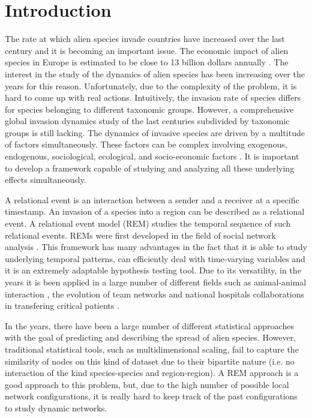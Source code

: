 \documentclass[mscthesis]{usiinfthesis}
\begin{document}
\chapter{Introduction}

The rate at which alien species invade countries have increased over the last century and it is becoming an important issue. The economic impact of alien species in Europe is estimated to be close to 13 billion dollars annually \cite{intro:rate}. The interest in the study of the dynamics of alien species has been increasing over the years for this reason. Unfortunately, due to the complexity of the problem, it is hard to come up with real actions. Intuitively, the invasion rate of species differs for species belonging to different taxonomic groups. However, a comprehensive global invasion dynamics study of the last centuries subdivided by taxonomic groups is still lacking. The dynamics of invasive species are driven by a multitude of factors simultaneously. These factors can be complex involving exogenous, endogenous, sociological, ecological, and socio-economic factors \cite{intro:factors}. It is important to develop a framework capable of studying and analyzing all these underlying effects simultaneously. 

A relational event is an interaction between a sender and a receiver at a specific timestamp. An invasion of a species into a region can be described as a relational event. A relational event model (REM) studies the temporal sequence of such relational events. REMs were first developed in the field of social network analysis \cite{rem:butts}. This framework has many advantages in the fact that it is able to study underlying temporal patterns, can efficiently deal with time-varying variables and it is an extremely adaptable hypothesis testing tool. Due to its versatility, in the years it is been applied in a large number of different fields such as animal-animal interaction \cite{intro:cattle}, the evolution of team networks \cite{intro:teams} and national hospitals collaborations in transfering critical patients \cite{intro:hospital}. 

In the years, there have been a large number of different statistical approaches with the goal of predicting and describing the spread of alien species. However, traditional statistical tools, such as multidimensional scaling, fail to capture the similarity of nodes on this kind of dataset due to their bipartite nature (i.e. no interaction of the kind species-species and region-region). A REM approach is a good approach to this problem, but, due to the high number of possible local network configurations, it is really hard to keep track of the past configurations to study dynamic networks.
\end{document}
